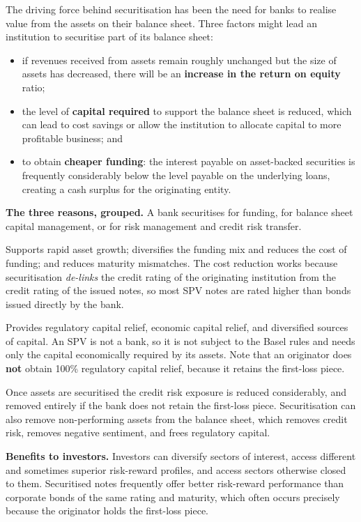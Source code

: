 \begin{crgapbox}
The driving force behind securitisation has been the need for banks to realise
value from the assets on their balance sheet. Three factors might lead an
institution to securitise part of its balance sheet:

\begin{itemize}
\item if revenues received from assets remain roughly unchanged but the size of
assets has decreased, there will be an \textbf{increase in the return on equity}
ratio;
\item the level of \textbf{capital required} to support the balance sheet is
reduced, which can lead to cost savings or allow the institution to allocate
capital to more profitable business; and
\item to obtain \textbf{cheaper funding}: the interest payable on asset-backed
securities is frequently considerably below the level payable on the underlying
loans, creating a cash surplus for the originating entity.
\end{itemize}

\textbf{The three reasons, grouped.} A bank securitises for funding, for balance
sheet capital management, or for risk management and credit risk transfer.

\smallskip
{} Supports rapid asset growth; diversifies the funding mix and
reduces the cost of funding; and reduces maturity mismatches. The cost reduction
works because securitisation \emph{de-links} the credit rating of the originating
institution from the credit rating of the issued notes, so most SPV notes are
rated higher than bonds issued directly by the bank.

\smallskip
{} Provides regulatory capital relief,
economic capital relief, and diversified sources of capital. An SPV is not a bank,
so it is not subject to the Basel rules and needs only the capital economically
required by its assets. Note that an originator does \textbf{not} obtain 100\%
regulatory capital relief, because it retains the first-loss piece.

\smallskip
{} Once assets are securitised the credit risk exposure is
reduced considerably, and removed entirely if the bank does not retain the
first-loss piece. Securitisation can also remove non-performing assets from the
balance sheet, which removes credit risk, removes negative sentiment, and frees
regulatory capital.

\smallskip
\textbf{Benefits to investors.} Investors can diversify sectors of interest,
access different and sometimes superior risk-reward profiles, and access sectors
otherwise closed to them. Securitised notes frequently offer better risk-reward
performance than corporate bonds of the same rating and maturity, which often
occurs precisely because the originator holds the first-loss piece.
\end{crgapbox}

